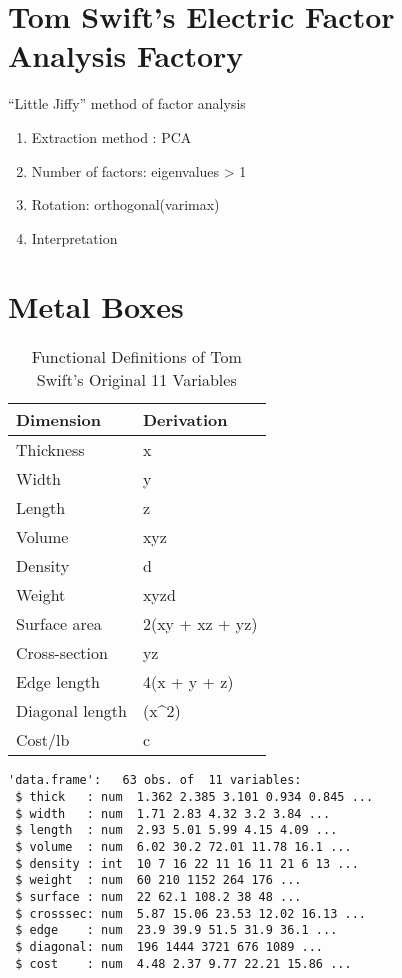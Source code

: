 \documentclass[
]{book}
\providecommand{\tightlist}{%
  \setlength{\itemsep}{0pt}\setlength{\parskip}{0pt}}
\begin{document}
\hypertarget{tom-swifts-electric-factor-analysis-factory}{%
\section{Tom Swift's Electric Factor Analysis Factory}\label{tom-swifts-electric-factor-analysis-factory}}

``Little Jiffy'' method of factor analysis

\begin{enumerate}
\def\labelenumi{\arabic{enumi}.}
\tightlist
\item
  Extraction method : PCA
\item
  Number of factors: eigenvalues \textgreater{} 1
\item
  Rotation: orthogonal(varimax)
\item
  Interpretation
\end{enumerate}

\hypertarget{metal-boxes}{%
\section{Metal Boxes}\label{metal-boxes}}

\begin{table}

\caption{\label{tab:unnamed-chunk-10}Functional Definitions of Tom Swift's Original 11 Variables}
\centering
\begin{tabular}[t]{l|l}
\hline
Dimension & Derivation\\
\hline
Thickness & x\\
\hline
Width & y\\
\hline
Length & z\\
\hline
Volume & xyz\\
\hline
Density & d\\
\hline
Weight & xyzd\\
\hline
Surface area & 2(xy + xz + yz)\\
\hline
Cross-section & yz\\
\hline
Edge length & 4(x + y + z)\\
\hline
Diagonal length & (x\textasciicircum{}2)\\
\hline
Cost/lb & c\\
\hline
\end{tabular}
\end{table}

\begin{verbatim}
'data.frame':   63 obs. of  11 variables:
 $ thick   : num  1.362 2.385 3.101 0.934 0.845 ...
 $ width   : num  1.71 2.83 4.32 3.2 3.84 ...
 $ length  : num  2.93 5.01 5.99 4.15 4.09 ...
 $ volume  : num  6.02 30.2 72.01 11.78 16.1 ...
 $ density : int  10 7 16 22 11 16 11 21 6 13 ...
 $ weight  : num  60 210 1152 264 176 ...
 $ surface : num  22 62.1 108.2 38 48 ...
 $ crosssec: num  5.87 15.06 23.53 12.02 16.13 ...
 $ edge    : num  23.9 39.9 51.5 31.9 36.1 ...
 $ diagonal: num  196 1444 3721 676 1089 ...
 $ cost    : num  4.48 2.37 9.77 22.21 15.86 ...
\end{verbatim}
\end{document}
